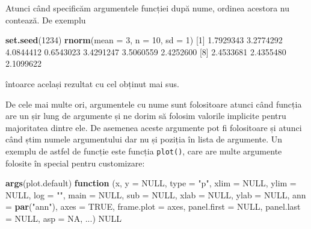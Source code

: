 \documentclass[]{article}
\newenvironment{Shaded}{\begin{snugshade}}{\end{snugshade}}
\newcommand{\KeywordTok}[1]{\textcolor[rgb]{0.13,0.29,0.53}{\textbf{#1}}}
\newcommand{\DataTypeTok}[1]{\textcolor[rgb]{0.13,0.29,0.53}{#1}}
\newcommand{\DecValTok}[1]{\textcolor[rgb]{0.00,0.00,0.81}{#1}}
\newcommand{\FloatTok}[1]{\textcolor[rgb]{0.00,0.00,0.81}{#1}}
\newcommand{\StringTok}[1]{\textcolor[rgb]{0.31,0.60,0.02}{#1}}
\newcommand{\OtherTok}[1]{\textcolor[rgb]{0.56,0.35,0.01}{#1}}
\newcommand{\ControlFlowTok}[1]{\textcolor[rgb]{0.13,0.29,0.53}{\textbf{#1}}}
\newcommand{\NormalTok}[1]{#1}
\begin{document}
Atunci când specificăm argumentele funcției după nume, ordinea acestora
nu contează. De exemplu

\begin{Shaded}
\begin{Highlighting}[]
\KeywordTok{set.seed}\NormalTok{(}\DecValTok{1234}\NormalTok{)}
\KeywordTok{rnorm}\NormalTok{(}\DataTypeTok{mean =} \DecValTok{3}\NormalTok{, }\DataTypeTok{n =} \DecValTok{10}\NormalTok{, }\DataTypeTok{sd =} \DecValTok{1}\NormalTok{)}
\NormalTok{ [}\DecValTok{1}\NormalTok{] }\FloatTok{1.7929343} \FloatTok{3.2774292} \FloatTok{4.0844412} \FloatTok{0.6543023} \FloatTok{3.4291247} \FloatTok{3.5060559} \FloatTok{2.4252600}
\NormalTok{ [}\DecValTok{8}\NormalTok{] }\FloatTok{2.4533681} \FloatTok{2.4355480} \FloatTok{2.1099622}
\end{Highlighting}
\end{Shaded}

întoarce același rezultat cu cel obținut mai sus.

De cele mai multe ori, argumentele cu nume sunt folositoare atunci când
funcția are un șir lung de argumente și ne dorim să folosim valorile
implicite pentru majoritatea dintre ele. De asemenea aceste argumente
pot fi folositoare și atunci când știm numele argumentului dar nu și
poziția în lista de argumente. Un exemplu de astfel de funcție este
funcția \texttt{plot()}, care are multe argumente folosite în special
pentru customizare:

\begin{Shaded}
\begin{Highlighting}[]
\KeywordTok{args}\NormalTok{(plot.default)}
\ControlFlowTok{function}\NormalTok{ (x, }\DataTypeTok{y =} \OtherTok{NULL}\NormalTok{, }\DataTypeTok{type =} \StringTok{"p"}\NormalTok{, }\DataTypeTok{xlim =} \OtherTok{NULL}\NormalTok{, }\DataTypeTok{ylim =} \OtherTok{NULL}\NormalTok{, }
    \DataTypeTok{log =} \StringTok{""}\NormalTok{, }\DataTypeTok{main =} \OtherTok{NULL}\NormalTok{, }\DataTypeTok{sub =} \OtherTok{NULL}\NormalTok{, }\DataTypeTok{xlab =} \OtherTok{NULL}\NormalTok{, }\DataTypeTok{ylab =} \OtherTok{NULL}\NormalTok{, }
    \DataTypeTok{ann =} \KeywordTok{par}\NormalTok{(}\StringTok{"ann"}\NormalTok{), }\DataTypeTok{axes =} \OtherTok{TRUE}\NormalTok{, }\DataTypeTok{frame.plot =}\NormalTok{ axes, }\DataTypeTok{panel.first =} \OtherTok{NULL}\NormalTok{, }
    \DataTypeTok{panel.last =} \OtherTok{NULL}\NormalTok{, }\DataTypeTok{asp =} \OtherTok{NA}\NormalTok{, ...) }
\OtherTok{NULL}
\end{Highlighting}
\end{Shaded}
\end{document}
